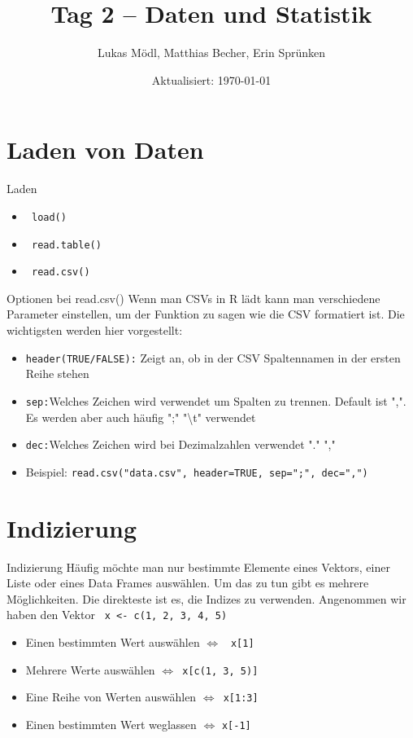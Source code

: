 \documentclass[aspectratio = 169]{chariteBeamer}
\author[L. Mödl, M. Becher, E. Sprünken]{Lukas Mödl, Matthias Becher, Erin Sprünken}
\title{Tag 2 -- Daten und Statistik}
\date[]{Aktualisiert: \today}
\begin{document}
\begin{frame}[plain]
    \titlepage%
\end{frame}
\frame{\tableofcontents}

\section{Laden von Daten}
\begin{frame}[fragile]{Laden}
  \begin{itemize}
	  \item \verb + load() +
	  \item  \verb + read.table() +
	  \item  \verb + read.csv() +
  \end{itemize}
\end{frame}

\begin{frame}[fragile]{Optionen bei read.csv()}
Wenn man CSVs in R lädt kann man verschiedene Parameter einstellen, um der Funktion zu sagen wie die CSV formatiert ist. Die wichtigsten werden hier vorgestellt:
  \begin{itemize}
	  \item \verb +header(TRUE/FALSE):+ Zeigt an, ob in der CSV Spaltennamen in der ersten Reihe stehen
	  \item \verb +sep:+Welches Zeichen wird verwendet um Spalten zu trennen. Default ist ",". Es werden aber auch häufig ";"   "\textbackslash t" verwendet
	  \item \verb +dec:+Welches Zeichen wird bei Dezimalzahlen verwendet "."  ","
	  \item	Beispiel: \verb +read.csv("data.csv", header=TRUE, sep=";", dec=",")+
  \end{itemize}
\end{frame}

\section{Indizierung}
\begin{frame}[fragile]{Indizierung}
	Häufig möchte man nur bestimmte Elemente eines Vektors, einer Liste oder eines Data Frames auswählen. Um das zu tun gibt es mehrere Möglichkeiten. Die direkteste ist es, die Indizes zu verwenden. Angenommen wir haben den Vektor \verb + x <- c(1, 2, 3, 4, 5) +
	\begin{itemize}
		\item  Einen bestimmten Wert auswählen $\Leftrightarrow$ \verb+ x[1]+
		\item  Mehrere Werte auswählen $\Leftrightarrow$\verb+ x[c(1, 3, 5)]+
		\item  Eine Reihe von Werten auswählen $\Leftrightarrow$\verb+ x[1:3]+
		\item  Einen bestimmten Wert weglassen $\Leftrightarrow$ \verb+x[-1]+
	\end{itemize}
\end{frame}
\end{document}
